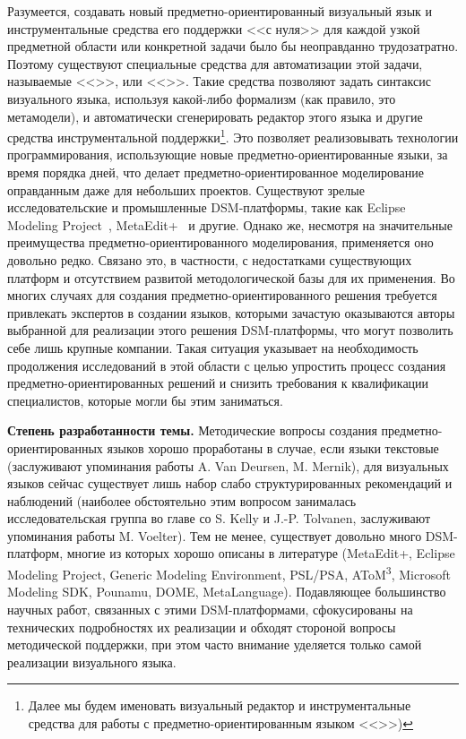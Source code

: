 Разумеется, создавать новый предметно-ориентированный визуальный язык и 
инструментальные средства его поддержки <<с нуля>> для каждой узкой предметной 
области или конкретной задачи было бы неоправданно трудозатратно. Поэтому 
существуют специальные средства для автоматизации этой задачи, называемые 
<<>>, или <<>>. Такие средства позволяют задать 
синтаксис визуального языка, используя какой-либо формализм (как правило, 
это метамодели), и автоматически сгенерировать редактор этого языка и другие средства инструментальной 
поддержки\footnote{Далее мы будем именовать визуальный редактор и инструментальные 
средства для работы с предметно-ориентированным языком <<>>)}. 
Это позволяет реализовывать технологии программирования, использующие новые предметно-ориентированные языки, за время 
порядка дней, что делает предметно-ориентированное моделирование оправданным 
даже для небольших проектов. Существуют зрелые исследовательские и промышленные 
\ac{DSM}-платформы, такие как Eclipse Modeling Project~\cite{emp}, MetaEdit+~\cite{metaEdit} 
и другие. Однако же, несмотря на значительные преимущества предметно-ориентированного 
моделирования, применяется оно довольно редко. Связано это, в частности, с 
недостатками существующих платформ и отсутствием развитой методологической 
базы для их применения. Во многих случаях для создания предметно-ориентированного 
решения требуется привлекать экспертов в создании языков, которыми зачастую 
оказываются авторы выбранной для реализации этого решения \ac{DSM}-платформы, что 
могут позволить себе лишь крупные компании. Такая ситуация указывает на 
необходимость продолжения исследований в этой области с целью упростить процесс создания
предметно-ориентированных решений и снизить требования к квалификации специалистов, 
которые могли бы этим заниматься.

\textbf{Степень разработанности темы.}
Методические вопросы создания предметно-ориентированных языков хорошо проработаны в случае, если 
языки текстовые (заслуживают упоминания работы A. Van Deursen, M. Mernik), для визуальных
языков сейчас существует лишь набор слабо структурированных рекомендаций и наблюдений
(наиболее обстоятельно этим вопросом занималась исследовательская группа во главе 
со S. Kelly и J.-P. Tolvanen, заслуживают упоминания работы M. Voelter). Тем не менее, 
существует довольно много DSM-платформ, многие из которых хорошо описаны в литературе 
(MetaEdit+, Eclipse Modeling Project, Generic Modeling Environment, PSL/PSA, AToM\textsuperscript{3},
Microsoft Modeling SDK, Pounamu, DOME, MetaLanguage). Подавляющее большинство 
научных работ, связанных с этими DSM-платформами, сфокусированы на технических подробностях
их реализации и обходят стороной вопросы методической поддержки, при этом часто внимание 
уделяется только самой реализации визуального языка.

